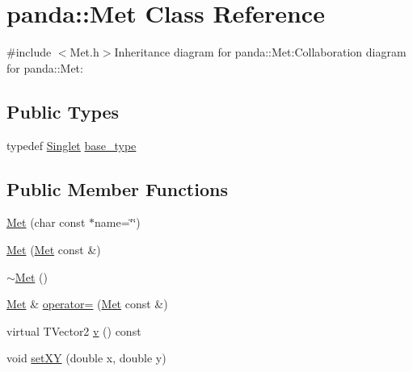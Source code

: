 \hypertarget{classpanda_1_1Met}{
\section{panda::Met Class Reference}
\label{classpanda_1_1Met}
}


{\ttfamily \#include $<$Met.h$>$}Inheritance diagram for panda::Met:Collaboration diagram for panda::Met:\subsection*{Public Types}
\begin{DoxyCompactItemize}
\item 
typedef \hyperlink{classpanda_1_1Singlet}{Singlet} \hyperlink{classpanda_1_1Met_a1676ccce630ca27435393bad8059cfcc}{base\_\-type}
\end{DoxyCompactItemize}
\subsection*{Public Member Functions}
\begin{DoxyCompactItemize}
\item 
\hyperlink{classpanda_1_1Met_a7bddafddf79440a1e31a1a18ed7d59c5}{Met} (char const $\ast$name=\char`\"{}\char`\"{})
\item 
\hyperlink{classpanda_1_1Met_ab48ed0a53644d320f210437b009043b5}{Met} (\hyperlink{classpanda_1_1Met}{Met} const \&)
\item 
\hyperlink{classpanda_1_1Met_aa8776da8d9be6dc0ff1e37ee54ddc69f}{$\sim$Met} ()
\item 
\hyperlink{classpanda_1_1Met}{Met} \& \hyperlink{classpanda_1_1Met_a75a8d56e25e884dfd9bdeff20b3d0b61}{operator=} (\hyperlink{classpanda_1_1Met}{Met} const \&)
\item 
virtual TVector2 \hyperlink{classpanda_1_1Met_a535aa3038be16e650ffcdf2d658d8ae6}{v} () const 
\item 
void \hyperlink{classpanda_1_1Met_af3f84170e9ef0be9b78722d149eb7895}{setXY} (double x, double y)
\end{DoxyCompactItemize}
